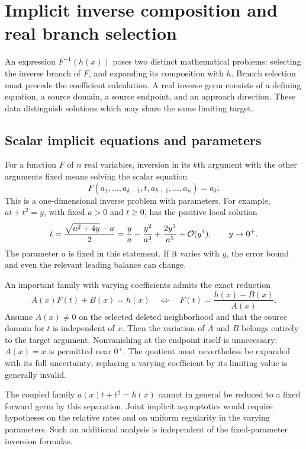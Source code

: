 \section{Implicit inverse composition and real branch selection}
\label{sec:inverse-function-expressions}

An expression $F^{-1}(h(x))$ poses two distinct mathematical problems:
selecting the inverse branch of $F$, and expanding its composition with
$h$. Branch selection must precede the coefficient calculation. A real
inverse germ consists of a defining equation, a source domain, a source
endpoint, and an approach direction. These data distinguish solutions
which may share the same limiting target.

\subsection{Scalar implicit equations and parameters}

For a function $F$ of $n$ real variables, inversion in its $k$th argument
with the other arguments fixed means solving the scalar equation
\begin{equation}
 F(a_1,\ldots,a_{k-1},t,a_{k+1},\ldots,a_n)=a_k.
 \label{eq:inverse-expression-selected-argument}
\end{equation}
This is a one-dimensional inverse problem with parameters. For example,
$a t+t^2=y$, with fixed $a>0$ and $t\ge0$, has the positive local solution
\[
 t=\frac{\sqrt{a^2+4y}-a}{2}
   =\frac ya-\frac{y^2}{a^3}+\frac{2y^3}{a^5}
     +\mathcal O(y^4),\qquad y\to0^+.
\]
The parameter $a$ is fixed in this statement. If it varies with $y$, the
error bound and even the relevant leading balance can change.

An important family with varying coefficients admits the exact reduction
\[
 A(x)F(t)+B(x)=h(x)
 \quad\Longleftrightarrow\quad
 F(t)=\frac{h(x)-B(x)}{A(x)}.
\]
Assume $A(x)\ne0$ on the selected deleted neighborhood and that the
source domain for $t$ is independent of $x$. Then the variation of $A$
and $B$ belongs entirely to the target argument. Nonvanishing at the
endpoint itself is unnecessary: $A(x)=x$ is permitted near $0^+$.
The quotient must nevertheless be expanded with its full uncertainty;
replacing a varying coefficient by its limiting value is generally invalid.

The coupled family $a(x)t+t^2=h(x)$ cannot in general be reduced to a
fixed forward germ by this separation. Joint implicit asymptotics would
require hypotheses on the relative rates and on uniform regularity in the
varying parameters. Such an additional analysis is independent of the
fixed-parameter inversion formulas.

